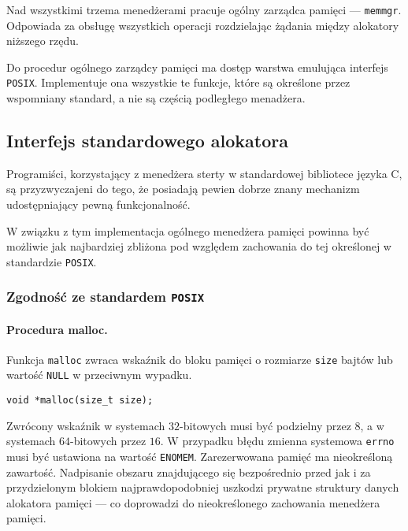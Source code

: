 \documentclass[12pt,a4paper,titlepage,twoside]{mwart}
\begin{document}
Nad wszystkimi trzema menedżerami pracuje ogólny zarządca pamięci ---
\texttt{memmgr}. Odpowiada za obsługę wszystkich operacji rozdzielając
żądania między alokatory niższego rzędu.

Do procedur ogólnego zarządcy pamięci ma dostęp warstwa emulująca interfejs
\texttt{POSIX}. Implementuje ona wszystkie te funkcje, które są określone przez
wspomniany standard, a nie są częścią podległego menadżera.

\newpage

\subsection{Interfejs standardowego alokatora}

\label{PosixMalloc}

Programiści, korzystający z menedżera sterty w standardowej bibliotece języka
C, są przyzwyczajeni do tego, że posiadają pewien dobrze znany mechanizm
udostępniający pewną funkcjonalność.

W związku z tym implementacja ogólnego menedżera pamięci powinna być możliwie
jak najbardziej zbliżona pod względem zachowania do tej określonej w
standardzie \texttt{POSIX}.

\subsubsection{Zgodność ze standardem \texttt{POSIX}}

\paragraph{Procedura malloc.}

Funkcja \texttt{malloc} zwraca wskaźnik do bloku pamięci o rozmiarze
\texttt{size} bajtów lub wartość \texttt{NULL} w przeciwnym wypadku.

\vspace{2ex}
\begin{lstlisting}[caption={Prototyp procedury \texttt{malloc}.}]
void *malloc(size_t size);
\end{lstlisting}

Zwrócony wskaźnik w systemach $32$-bitowych musi być podzielny przez $8$, a w
systemach $64$-bitowych przez $16$. W przypadku błędu zmienna systemowa
\texttt{errno} musi być ustawiona na wartość \texttt{ENOMEM}. Zarezerwowana
pamięć ma nieokreśloną zawartość. Nadpisanie obszaru znajdującego się
bezpośrednio przed jak i za przydzielonym blokiem najprawdopodobniej uszkodzi
prywatne struktury danych alokatora pamięci --- co doprowadzi do nieokreślonego
zachowania menedżera pamięci.
\end{document}
